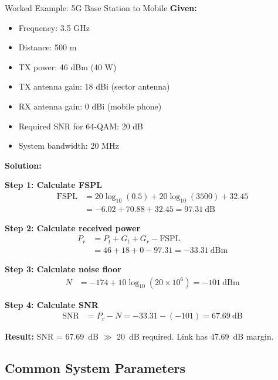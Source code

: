 \begin{calloutbox}{Worked Example: 5G Base Station to Mobile}
\textbf{Given:}
\begin{itemize}
\item Frequency: 3.5 GHz
\item Distance: 500 m
\item TX power: 46 dBm (40 W)
\item TX antenna gain: 18 dBi (sector antenna)
\item RX antenna gain: 0 dBi (mobile phone)
\item Required SNR for 64-QAM: 20 dB
\item System bandwidth: 20 MHz
\end{itemize}

\textbf{Solution:}

\textbf{Step 1: Calculate FSPL}
\begin{align*}
\text{FSPL} &= 20\log_{10}(0.5) + 20\log_{10}(3500) + 32.45 \\
&= -6.02 + 70.88 + 32.45 = 97.31~\text{dB}
\end{align*}

\textbf{Step 2: Calculate received power}
\begin{align*}
P_r &= P_t + G_t + G_r - \text{FSPL} \\
&= 46 + 18 + 0 - 97.31 = -33.31~\text{dBm}
\end{align*}

\textbf{Step 3: Calculate noise floor}
\begin{align*}
N &= -174 + 10\log_{10}(20 \times 10^6) = -101~\text{dBm}
\end{align*}

\textbf{Step 4: Calculate SNR}
\begin{align*}
\text{SNR} &= P_r - N = -33.31 - (-101) = 67.69~\text{dB}
\end{align*}

\textbf{Result:} SNR = 67.69~dB $\gg$ 20~dB required. Link has 47.69~dB margin.
\end{calloutbox}

\subsection{Common System Parameters}
\label{subsec:common-systems}


